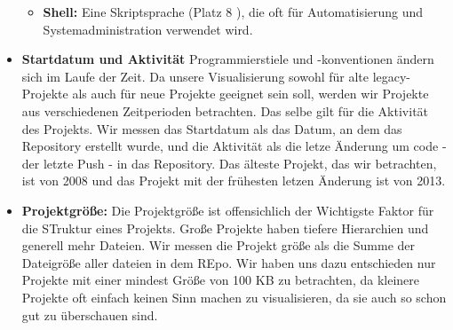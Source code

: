 \begin{itemize}
\begin{itemize}
        \item \textbf{Shell:} Eine Skriptsprache (Platz 8 \cite{software_state_2022}), die oft für Automatisierung und Systemadministration verwendet wird.
    \end{itemize}
    \item \textbf{Startdatum und Aktivität} Programmierstiele und -konventionen ändern sich im Laufe der Zeit. Da unsere Visualisierung sowohl für alte legacy-Projekte als auch für neue Projekte geeignet sein soll, werden wir Projekte aus verschiedenen Zeitperioden betrachten. Das selbe gilt für die Aktivität des Projekts. Wir messen das Startdatum als das Datum, an dem das Repository erstellt wurde, und die Aktivität als die letze Änderung um code - der letzte Push - in das Repository. Das älteste Projekt, das wir betrachten, ist von 2008 und das Projekt mit der frühesten letzen Änderung ist von 2013.
    \item \textbf{Projektgröße:} Die Projektgröße ist offensichlich der Wichtigste Faktor für die STruktur eines Projekts. Große Projekte haben tiefere Hierarchien und generell mehr Dateien. Wir messen die Projekt größe als die Summe der Dateigröße aller dateien in dem REpo. Wir haben uns dazu entschieden nur Projekte mit einer mindest Größe von 100 KB zu betrachten, da kleinere Projekte oft einfach keinen Sinn machen zu visualisieren, da sie auch so schon gut zu überschauen sind.
\end{itemize}
    



